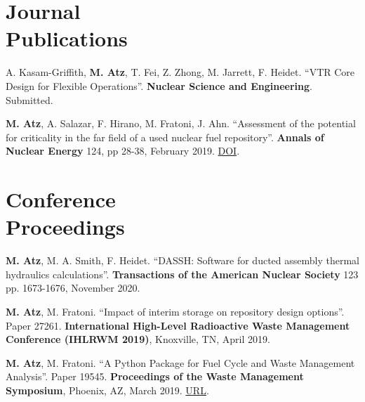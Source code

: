 \documentclass[margin,line]{resume}
\begin{document}
\begin{resume}
\section{\mysidestyle Journal\\Publications}
\begin{bibenum}

    \item A. Kasam-Griffith, \textbf{M. Atz}, T. Fei, Z. Zhong, M. Jarrett, F. Heidet. ``VTR Core Design for Flexible Operations''. \textbf{Nuclear Science and Engineering}. Submitted.


    \item \textbf{M. Atz}, A. Salazar, F. Hirano, M. Fratoni, J. Ahn. ``Assessment of the potential for criticality in the far field of a used nuclear fuel repository''. \textbf{Annals of Nuclear Energy} 124, pp 28-38, February 2019. \href{https://doi.org/10.1016/j.anucene.2018.09.028}{DOI}.
    
\end{bibenum}
\section{\mysidestyle Conference\\Proceedings}
\begin{bibenum}

    \item \textbf{M. Atz}, M. A. Smith, F. Heidet. ``DASSH: Software for ducted assembly thermal hydraulics calculations''. \textbf{Transactions of the American Nuclear Society} 123 pp. 1673-1676, November 2020.

    \item \textbf{M. Atz}, M. Fratoni. ``Impact of interim storage on repository design options''. Paper 27261. \textbf{International High-Level Radioactive Waste Management Conference (IHLRWM 2019)}, Knoxville, TN, April 2019.
    
    \item \textbf{M. Atz}, M. Fratoni. ``A Python Package for Fuel Cycle and Waste Management Analysis''. Paper 19545. \textbf{Proceedings of the Waste Management Symposium}, Phoenix, AZ, March 2019. \href{http://amz.xcdsystem.com/A464D2CF-E476-F46B-841E415B85C431CC_finalpapers_2019/FinalPaper_19545_0121045947.pdf}{URL}.
    

\end{bibenum}
\end{resume}
\end{document}
